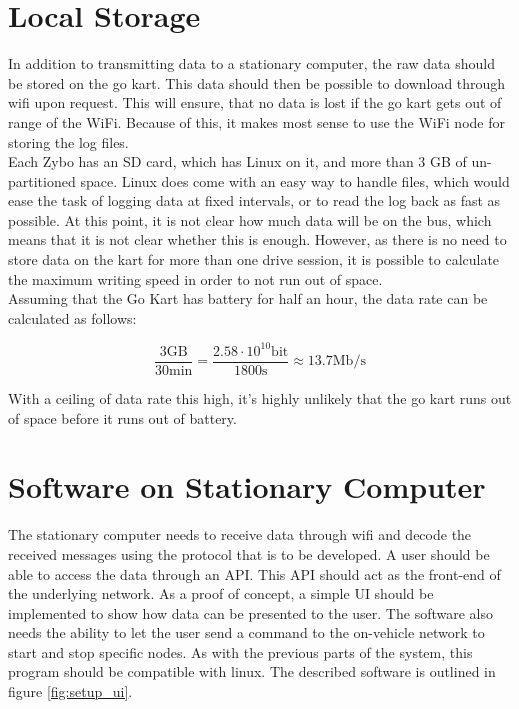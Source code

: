 
\section{Local Storage}
In addition to transmitting data to a stationary computer, the raw data should be stored on the go kart.
This data should then be possible to download through wifi upon request.
This will ensure, that no data is lost if the go kart gets out of range of the WiFi.
Because of this, it makes most sense to use the WiFi node for storing the log files.\\

Each Zybo has an SD card, which has Linux on it, and more than 3 GB of un-partitioned space. 
Linux does come with an easy way to handle files, which would ease the task of logging data at fixed intervals, or to read the log back as fast as possible.
At this point, it is not clear how much data will be on the bus, which means that it is not clear whether this is enough.
However, as there is no need to store data on the kart for more than one drive session, it is possible to calculate the maximum writing speed in order to not run out of space.\\

Assuming that the Go Kart has battery for half an hour, the data rate can be calculated as follows:

\begin{equation}
	\frac{3\mathrm{GB}}{30\si{\minute}} = \frac{2.58 \cdot 10^{10} \mathrm{bit}}{1800 \si{\second}} \approx 13.7 \mathrm{Mb/s}
\end{equation}

With a ceiling of data rate this high, it's highly unlikely that the go kart runs out of space before it runs out of battery.

\section{Software on Stationary Computer}
The stationary computer needs to receive data through wifi and decode the received messages using the protocol that is to be developed.
A user should be able to access the data through an API.
This API should act as the front-end of the underlying network.
As a proof of concept, a simple UI should be implemented to show how data can be presented to the user.
The software also needs the ability to let the user send a command to the on-vehicle network to start and stop specific nodes.
As with the previous parts of the system, this program should be compatible with linux.
The described software is outlined in figure \ref{fig:setup_ui}.

